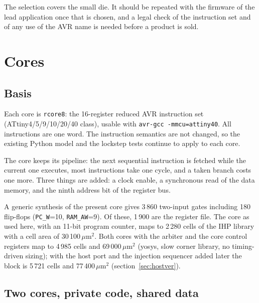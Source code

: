 \documentclass[10pt,a4paper]{article}
\begin{document}
The selection covers the small die. It should be repeated with the firmware of the lead application once that
is chosen, and a legal check of the instruction set and of any use of the AVR name is needed before a product
is sold.

\section{Cores}\label{sec:cores}

\subsection{Basis}

Each core is \texttt{rcore8}: the 16-register reduced AVR instruction set (ATtiny4/5/9/10/20/40 class), usable
with \texttt{avr-gcc -mmcu=attiny40}. All instructions are one word. The instruction semantics are not changed,
so the existing Python model and the lockstep tests continue to apply to each core.

The core keeps its pipeline: the next sequential instruction is fetched while the current one executes, most
instructions take one cycle, and a taken branch costs one more. Three things are added: a clock enable, a
synchronous read of the data memory, and the ninth address bit of the register bus.

A generic synthesis of the present core gives 3\,860 two-input gates including 180 flip-flops
(\texttt{PC\_W}=10, \texttt{RAM\_AW}=9). Of these, 1\,900 are the register file. The core as used here, with an 11-bit program counter, maps to 2\,280 cells of the IHP library with a cell area of 30\,100\,$\mu$m$^2$. Both cores with the arbiter and the core control registers map to 4\,985 cells and 69\,000\,$\mu$m$^2$ (yosys, slow corner library, no timing-driven sizing); with the host port and the injection sequencer added later the block is 5\,721 cells and 77\,400\,$\mu$m$^2$ (section~\ref{sec:hostver}).

\subsection{Two cores, private code, shared data}
\end{document}
